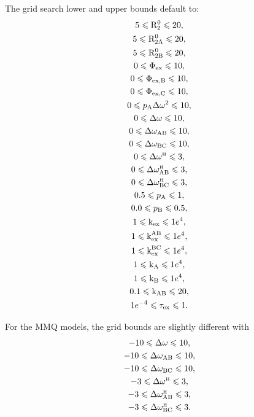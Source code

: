 The grid search lower and upper bounds default to:
\begin{subequations}
\begin{gather} 
    5 \leqslant \mathrm{R}_2^0 \leqslant 20, \\
    5 \leqslant \mathrm{R}_{\mathrm{2A}}^0 \leqslant 20, \\
    5 \leqslant \mathrm{R}_{\mathrm{2B}}^0 \leqslant 20, \\
    0 \leqslant \Phi_{\textrm{ex}} \leqslant 10, \\
    0 \leqslant \Phi_{\textrm{ex,B}} \leqslant 10, \\
    0 \leqslant \Phi_{\textrm{ex,C}} \leqslant 10, \\
    0 \leqslant p_{\textrm{A}}\Delta\omega^2 \leqslant 10, \\
    0 \leqslant \Delta\omega \leqslant 10, \\
    0 \leqslant \Delta\omega_{\textrm{AB}} \leqslant 10, \\
    0 \leqslant \Delta\omega_{\textrm{BC}} \leqslant 10, \\
    0 \leqslant \Delta\omega^{\scriptscriptstyle\mathrm{H}} \leqslant 3, \\
    0 \leqslant \Delta\omega^{\scriptscriptstyle\mathrm{H}}_{\textrm{AB}} \leqslant 3, \\
    0 \leqslant \Delta\omega^{\scriptscriptstyle\mathrm{H}}_{\textrm{BC}} \leqslant 3, \\
    0.5 \leqslant p_{\textrm{A}} \leqslant 1, \\
    0.0 \leqslant p_{\textrm{B}} \leqslant 0.5, \\
    1 \leqslant \textrm{k}_{\textrm{ex}} \leqslant 1e^4, \\
    1 \leqslant \textrm{k}_{\textrm{ex}}^{\textrm{AB}} \leqslant 1e^4, \\
    1 \leqslant \textrm{k}_{\textrm{ex}}^{\textrm{BC}} \leqslant 1e^4, \\
    1 \leqslant \textrm{k}_{\textrm{A}} \leqslant 1e^4, \\
    1 \leqslant \textrm{k}_{\textrm{B}} \leqslant 1e^4, \\
    0.1 \leqslant \textrm{k}_{\textrm{AB}} \leqslant 20, \\
    1e^{-4} \leqslant \tau_{\textrm{ex}} \leqslant 1.
\end{gather} 
\end{subequations}

For the MMQ models, the grid bounds are slightly different with
\begin{subequations}
\begin{gather} 
    -10 \leqslant \Delta\omega \leqslant 10, \\
    -10 \leqslant \Delta\omega_{\textrm{AB}} \leqslant 10, \\
    -10 \leqslant \Delta\omega_{\textrm{BC}} \leqslant 10, \\
    -3 \leqslant \Delta\omega^{\scriptscriptstyle\mathrm{H}} \leqslant 3, \\
    -3 \leqslant \Delta\omega^{\scriptscriptstyle\mathrm{H}}_{\textrm{AB}} \leqslant 3, \\
    -3 \leqslant \Delta\omega^{\scriptscriptstyle\mathrm{H}}_{\textrm{BC}} \leqslant 3.
\end{gather} 
\end{subequations}

